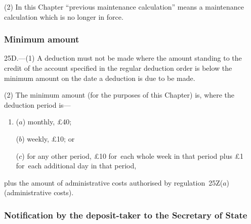 \documentclass[12pt,a4paper]{article}
\begin{document}
(2) In this Chapter “previous maintenance calculation” means a maintenance calculation which is no longer in force.


\subsubsection[25D. Minimum amount]{Minimum amount}

25D.---(1)  A deduction must not be made where the amount standing to the credit of the account specified in the regular deduction order is below the minimum amount on the date a deduction is due to be made.

(2) The minimum amount (for the purposes of this Chapter) is, where the deduction period is—
\begin{enumerate}\item[]
($a$) monthly, £40;

($b$) weekly, £10; or

($c$) for any other period, £10 for~each whole week in that period plus £1 for~each additional day in that period,
\end{enumerate}
plus the amount of administrative costs authorised by regulation~25Z($a$)  (administrative costs).

\subsubsection[25E. Notification by the deposit-taker to the 
Secretary of State%
]{Notification by the deposit-taker to the 
Secretary of State%
}
\end{document}
